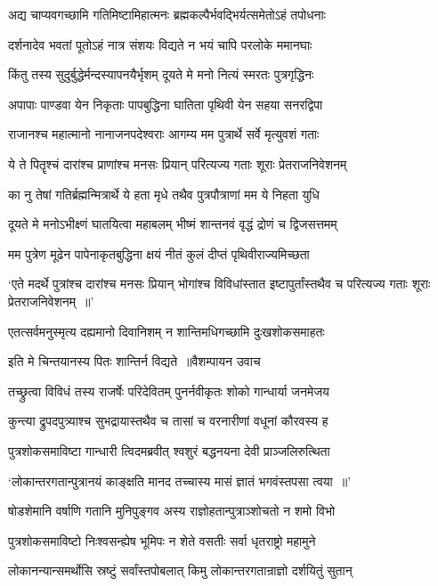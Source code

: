 \twolineshloka
{अद्य चाप्यवगच्छामि गतिमिष्टामिहात्मनः}
{ब्रह्मकल्पैर्भवद्भिर्यत्समेतोऽहं तपोधनाः}


\twolineshloka
{दर्शनादेव भवतां पूतोऽहं नात्र संशयः}
{विद्यते न भयं चापि परलोके ममानघाः}


\twolineshloka
{किंतु तस्य सुदुर्बुद्धेर्मन्दस्यापनयैर्भृशम्}
{दूयते मे मनो नित्यं स्मरतः पुत्रगृद्धिनः}


\twolineshloka
{अपापाः पाण्डवा येन निकृताः पापबुद्धिना}
{घातिता पृथिवी येन सहया सनरद्विपा}


\twolineshloka
{राजानश्च महात्मानो नानाजनपदेश्वराः}
{आगम्य मम पुत्रार्थे सर्वे मृत्युवशं गताः}


\twolineshloka
{ये ते पितॄश्चं दारांश्च प्राणांश्च मनसः प्रियान्}
{परित्यज्य गताः शूराः प्रेतराजनिवेशनम्}


\twolineshloka
{का नु तेषां गतिर्ब्रह्मन्मित्रार्थे ये हता मृधे}
{तथैव पुत्रपौत्राणां मम ये निहता युधि}


\twolineshloka
{दूयते मे मनोऽभीक्ष्णं घातयित्वा महाबलम्}
{भीष्मं शान्तनवं वृद्धं द्रोणं च द्विजसत्तमम्}


\twolineshloka
{मम पुत्रेण मूढेन पापेनाकृतबुद्धिना}
{क्षयं नीतं कुलं दीप्तं पृथिवीराज्यमिच्छता}


\threelineshloka
{`एते मदर्थे पुत्रांश्च दारांश्च मनसः प्रियान्}
{भोगांश्च विविधांस्तात इष्टापुर्तांस्तथैव च}
{परित्यज्य गताः शूराः प्रेतराजनिवेशनम् ॥'}


\twolineshloka
{एतत्सर्वमनुस्मृत्य दह्यमानो दिवानिशम्}
{न शान्तिमधिगच्छामि दुःखशोकसमाहतः}


\twolineshloka
{इति मे चिन्तयानस्य पितः शान्तिर्न विद्यते ॥वैशम्पायन उवाच}
{}


\twolineshloka
{तच्छ्रुत्वा विविधं तस्य राजर्षेः परिदेवितम्}
{पुनर्नवीकृतः शोको गान्धार्या जनमेजय}


\twolineshloka
{कुन्त्या द्रुपदपुत्र्याश्च सुभद्रायास्तथैव च}
{तासां च वरनारीणां वधूनां कौरवस्य ह}


\twolineshloka
{पुत्रशोकसमाविष्टा गान्धारी त्विदमब्रवीत्}
{श्वशुरं बद्धनयना देवी प्राञ्जलिरुत्थिता}


\twolineshloka
{`लोकान्तरगतान्पुत्रानयं काङ्क्षति मानद}
{तच्चास्य मासं ज्ञातं भगवंस्तपसा त्वया ॥'}


\twolineshloka
{षोडशेमानि वर्षाणि गतानि मुनिपुङ्गव}
{अस्य राज्ञोहतान्पुत्राञ्शोचतो न शमो विभो}


\twolineshloka
{पुत्रशोकसमाविष्टो निःश्वसन्ह्येष भूमिपः}
{न शेते वसतीः सर्वा धृतराष्ट्रो महामुने}


\twolineshloka
{लोकानन्यान्समर्थोसि स्रष्टुं सर्वांस्तपोबलात्}
{किमु लोकान्तरगतान्राज्ञो दर्शयितुं सुतान्}



